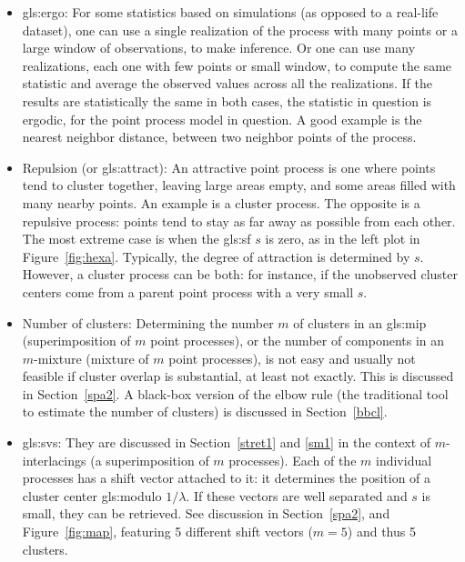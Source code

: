 \documentclass[10pt]{article}
\begin{document}
\begin{itemize}
\item \Gls{gls:ergo}: For some statistics based on simulations (as opposed to a real-life dataset), one can use a single realization
of the process with many points or a large window of observations, to make inference. Or one can use many realizations, each one with few points or small window, to compute the same statistic and average the observed values across all the realizations.  If the results are statistically the same in both cases, the statistic in question is ergodic, for the point process model in question. A good example is the \textcolor{index}{nearest neighbor distance}, 
between two neighbor points of the process.
\item Repulsion (or \gls{gls:attract}):  An \textcolor{index}{attractive point process} is one where points tend to cluster together, leaving large areas empty, and some areas filled with many nearby points. An example is a \textcolor{index}{cluster process}. The opposite is a repulsive process: points tend to stay as far away as possible from each other. The most extreme case is when the \gls{gls:sf} $s$ is zero, as in the left plot in Figure~\ref{fig:hexa}. Typically, the degree of attraction is determined by $s$. However, a cluster process can be both: for instance, if the unobserved cluster centers come from a
\textcolor{index}{parent point process} with a very small $s$.
\item Number of clusters: Determining the number $m$ of clusters in an \gls{gls:mip} (superimposition of $m$ point processes), or the number of components in an \textcolor{index}{$m$-mixture} (mixture of $m$ point processes), is not easy and usually
not feasible if cluster overlap is substantial, at least not exactly. This is discussed in Section~\ref{spa2}. A black-box version of the \textcolor{index}{elbow rule} (the traditional tool to estimate the number of clusters) 
is discussed in Section~\ref{bbcl}.  
\item \Glspl{gls:sv}: They are discussed in Section~\ref{stret1} and \ref{sm1} in the context of $m$-interlacings (a superimposition of $m$ processes). Each of the $m$ 
individual processes has a shift vector attached to it: it determines the position of a cluster center 
\gls{gls:modulo} $1/\lambda$. If these vectors are well separated and $s$ is small, they can be retrieved. See discussion in Section~\ref{spa2}, and Figure~\ref{fig:map}, featuring 5 different shift vectors ($m=5$) and thus 5 clusters.

\end{itemize}
\end{document}

